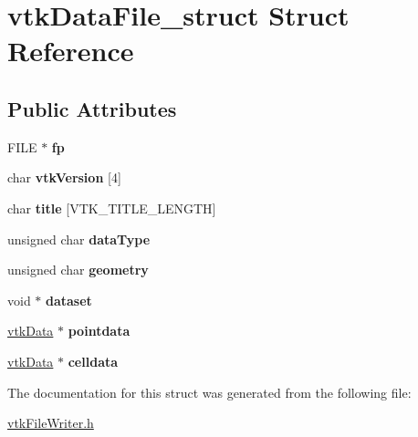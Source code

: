 \hypertarget{structvtkDataFile__struct}{
\section{vtkDataFile\_\-struct Struct Reference}
\label{structvtkDataFile__struct}
}
\subsection*{Public Attributes}
\begin{DoxyCompactItemize}
\item 
\hypertarget{structvtkDataFile__struct_a2c451b30a24d54ae7af6254a21bf194c}{
FILE $\ast$ {\bfseries fp}}
\label{structvtkDataFile__struct_a2c451b30a24d54ae7af6254a21bf194c}

\item 
\hypertarget{structvtkDataFile__struct_a00baaf3a79d179a7d7d8dcc1b788f929}{
char {\bfseries vtkVersion} \mbox{[}4\mbox{]}}
\label{structvtkDataFile__struct_a00baaf3a79d179a7d7d8dcc1b788f929}

\item 
\hypertarget{structvtkDataFile__struct_ad126de263f92be2aa8cadd7f3fd7a521}{
char {\bfseries title} \mbox{[}VTK\_\-TITLE\_\-LENGTH\mbox{]}}
\label{structvtkDataFile__struct_ad126de263f92be2aa8cadd7f3fd7a521}

\item 
\hypertarget{structvtkDataFile__struct_aabe79def96ac5af79564ce3f4faa2d73}{
unsigned char {\bfseries dataType}}
\label{structvtkDataFile__struct_aabe79def96ac5af79564ce3f4faa2d73}

\item 
\hypertarget{structvtkDataFile__struct_a65f43fdcb5ef6b56bb33df99e9dce6d8}{
unsigned char {\bfseries geometry}}
\label{structvtkDataFile__struct_a65f43fdcb5ef6b56bb33df99e9dce6d8}

\item 
\hypertarget{structvtkDataFile__struct_aa14df3a60c35a570fee62f8e554c5e74}{
void $\ast$ {\bfseries dataset}}
\label{structvtkDataFile__struct_aa14df3a60c35a570fee62f8e554c5e74}

\item 
\hypertarget{structvtkDataFile__struct_a9fbff7dca44990575977ca22c465aefb}{
\hyperlink{structvtkData__struct}{vtkData} $\ast$ {\bfseries pointdata}}
\label{structvtkDataFile__struct_a9fbff7dca44990575977ca22c465aefb}

\item 
\hypertarget{structvtkDataFile__struct_a8449c18dfcbb99c34c7f725e107e7d05}{
\hyperlink{structvtkData__struct}{vtkData} $\ast$ {\bfseries celldata}}
\label{structvtkDataFile__struct_a8449c18dfcbb99c34c7f725e107e7d05}

\end{DoxyCompactItemize}


The documentation for this struct was generated from the following file:\begin{DoxyCompactItemize}
\item 
\hyperlink{vtkFileWriter_8h}{vtkFileWriter.h}\end{DoxyCompactItemize}
